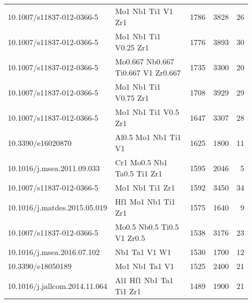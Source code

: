 \begin{tabular}{llrrr}
     10.1007/s11837-012-0366-5 &                           Mo1 Nb1 Ti1 V1 Zr1 &                1786 &                 3828 &                        26 \\
     10.1007/s11837-012-0366-5 &                        Mo1 Nb1 Ti1 V0.25 Zr1 &                1776 &                 3893 &                        30 \\
     10.1007/s11837-012-0366-5 &           Mo0.667 Nb0.667 Ti0.667 V1 Zr0.667 &                1735 &                 3300 &                        20 \\
     10.1007/s11837-012-0366-5 &                        Mo1 Nb1 Ti1 V0.75 Zr1 &                1708 &                 3929 &                        29 \\
     10.1007/s11837-012-0366-5 &                         Mo1 Nb1 Ti1 V0.5 Zr1 &                1647 &                 3307 &                        28 \\
             10.3390/e16020870 &                         Al0.5 Mo1 Nb1 Ti1 V1 &                1625 &                 1800 &                        11 \\
    10.1016/j.msea.2011.09.033 &                  Cr1 Mo0.5 Nb1 Ta0.5 Ti1 Zr1 &                1595 &                 2046 &                         5 \\
     10.1007/s11837-012-0366-5 &                              Mo1 Nb1 Ti1 Zr1 &                1592 &                 3450 &                        34 \\
  10.1016/j.matdes.2015.05.019 &                          Hf1 Mo1 Nb1 Ti1 Zr1 &                1575 &                 1640 &                         9 \\
     10.1007/s11837-012-0366-5 &                   Mo0.5 Nb0.5 Ti0.5 V1 Zr0.5 &                1538 &                 3176 &                        23 \\
    10.1016/j.msea.2016.07.102 &                                Nb1 Ta1 V1 W1 &                1530 &                 1700 &                        12 \\
             10.3390/e18050189 &                               Mo1 Nb1 Ta1 V1 &                1525 &                 2400 &                        21 \\
 10.1016/j.jallcom.2014.11.064 &                      Al1 Hf1 Nb1 Ta1 Ti1 Zr1 &                1489 &                 1900 &                        21 \\
\bottomrule
\end{tabular}
